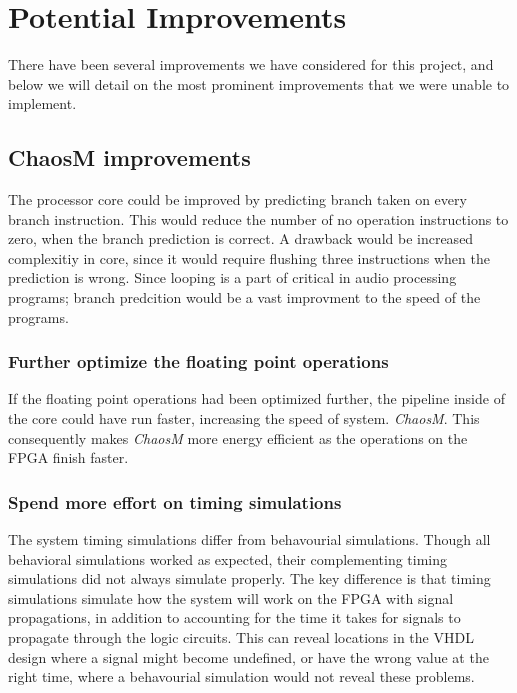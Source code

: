\section{Potential Improvements}

There have been several improvements we have considered for this project, and
below we will detail on the most prominent improvements that we were unable to
implement.

\subsection{ChaosM improvements}

The processor core could be improved by predicting branch taken on every branch instruction. This would reduce
the number of no operation instructions to zero, when the branch prediction is correct. A drawback would be increased
complexitiy in core, since it would require flushing three instructions when the prediction is wrong. Since looping is
a part of critical in audio processing programs; branch predcition would be a vast improvment to the speed of the programs.
\subsubsection{Further optimize the floating point operations}

If the floating point operations had been optimized further, the pipeline inside
of the core could have run faster, increasing the speed of system.
\textit{ChaosM}. This consequently makes \textit{ChaosM} more energy efficient as the operations on the FPGA finish faster.

\subsubsection{Spend more effort on timing simulations}

The system timing simulations differ from behavourial simulations. Though all behavioral
simulations worked as expected, their complementing timing simulations did
not always simulate properly.
The key difference is that timing simulations simulate how the system will work
on the FPGA with signal propagations, in addition to accounting for the time it
takes for signals to propagate through the logic circuits. This can reveal
locations in the VHDL design where a signal might become undefined, or have the
wrong value at the right time, where a behavourial simulation would not reveal
these problems.

